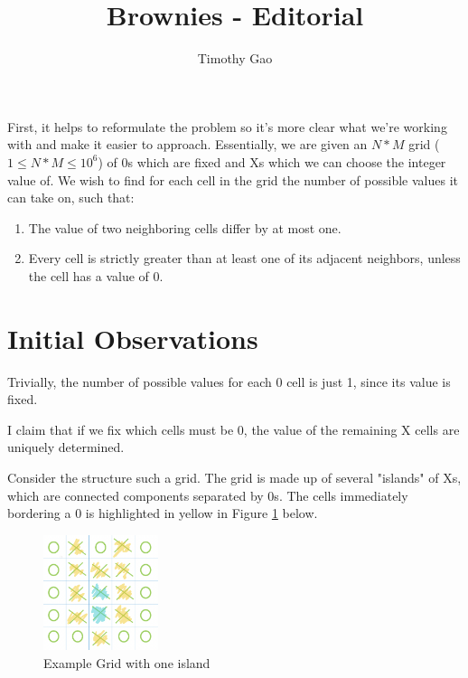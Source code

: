 \documentclass[15pt]{article}
\title{Brownies - Editorial}
\author{Timothy Gao}
\date{}
\begin{document}
\maketitle

First, it helps to reformulate the problem so it's more clear what we're working with and make it easier to approach. Essentially, we are given an $N * M$ grid ($1 \leq N * M \leq 10^6$) of 0s which are fixed and Xs which we can choose the integer value of. We wish to find for each cell in the grid the number of possible values it can take on, such that:

\begin{enumerate}
    \item The value of two neighboring cells differ by at most one.
    \item Every cell is strictly greater than at least one of its adjacent neighbors, unless the cell has a value of 0.
\end{enumerate}

\section{Initial Observations}

Trivially, the number of possible values for each 0 cell is just 1, since its value is fixed.

I claim that if we fix which cells must be 0, the value of the remaining X cells are uniquely determined.

Consider the structure such a grid. The grid is made up of several "islands" of Xs, which are connected components separated by 0s. The cells immediately bordering a 0 is highlighted in yellow in Figure \ref{fig:bordering} below.

\begin{figure}[h]
\centering
\includegraphics[width=0.3\textwidth]{Grid.png}
\caption{\label{fig:bordering}Example Grid with one island}
\end{figure}
\end{document}
